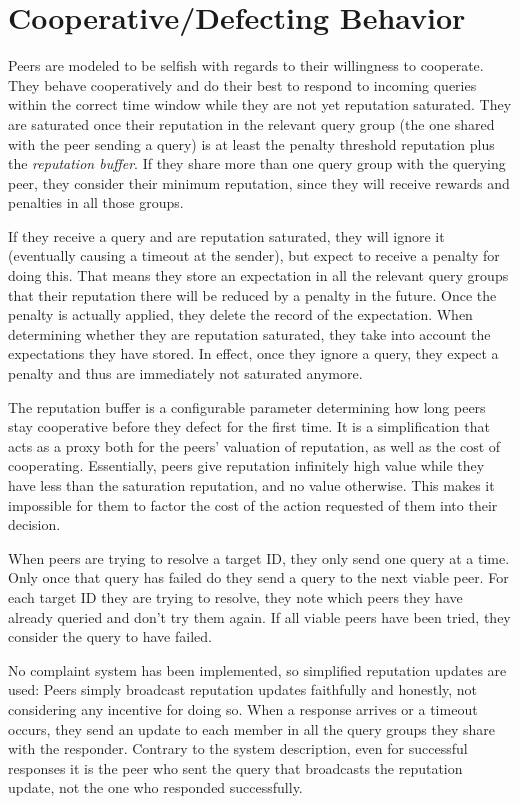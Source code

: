 \section{Cooperative/Defecting Behavior}
Peers are modeled to be selfish with regards to their willingness to cooperate.
They behave cooperatively and do their best to respond to incoming queries
within the correct time window while they are not yet reputation saturated.
They are saturated once their reputation in the relevant query group (the one
shared with the peer sending a query) is at least the penalty threshold
reputation plus the \emph{reputation buffer}. If they share more than one query
group with the querying peer, they consider their minimum reputation, since they
will receive rewards and penalties in all those groups.

If they receive a query and are reputation saturated, they will ignore it
(eventually causing a timeout at the sender), but expect to receive a penalty
for doing this. That means they store an expectation in all the relevant query
groups that their reputation there will be reduced by a penalty in the future.
Once the penalty is actually applied, they delete the record of the expectation.
When determining whether they are reputation saturated, they take into account
the expectations they have stored. In effect, once they ignore a query, they
expect a penalty and thus are immediately not saturated anymore.

The reputation buffer is a configurable parameter determining how long peers
stay cooperative before they defect for the first time. It is a simplification
that acts as a proxy both for the peers' valuation of reputation, as well as the
cost of cooperating. Essentially, peers give reputation infinitely high value
while they have less than the saturation reputation, and no value otherwise.
This makes it impossible for them to factor the cost of the action requested of
them into their decision.

When peers are trying to resolve a target ID, they only send one query at a
time. Only once that query has failed do they send a query to the next viable
peer. For each target ID they are trying to resolve, they note which peers they
have already queried and don't try them again. If all viable peers have been
tried, they consider the query to have failed.

No complaint system has been implemented, so simplified reputation updates are
used: Peers simply broadcast reputation updates faithfully and honestly, not
considering any incentive for doing so. When a response arrives or a timeout
occurs, they send an update to each member in all the query groups they share
with the responder. Contrary to the system description, even for successful
responses it is the peer who sent the query that broadcasts the reputation
update, not the one who responded successfully.

